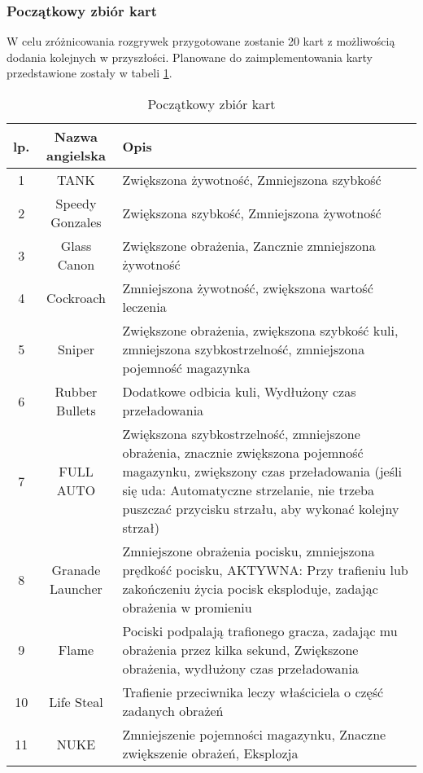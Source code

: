 \subsubsection{Początkowy zbiór kart}
W celu zróżnicowania rozgrywek przygotowane zostanie 20 kart z możliwością dodania kolejnych w przyszłości. Planowane do zaimplementowania karty przedstawione zostały w tabeli \ref{tab:cards}.

\begin{table}
    \small
    \centering
    \caption{Początkowy zbiór kart}
    \label{tab:cards}
    \begin{tabularx}{\linewidth}{|c|c|X|}
        \hline
        lp. & Nazwa angielska & Opis\\
        \hline \hline
        1   & TANK & Zwiększona żywotność, Zmniejszona szybkość \\
        \hline 
        2   & Speedy Gonzales & Zwiększona szybkość, Zmniejszona żywotność \\
        \hline 
        3   & Glass Canon & Zwiększone obrażenia, Zancznie zmniejszona żywotność \\
        \hline 
        4   & Cockroach & Zmniejszona żywotność, zwiększona wartość leczenia \\
        \hline 
        5   & Sniper & Zwiększone obrażenia, zwiększona szybkość kuli, zmniejszona szybkostrzelność, zmniejszona pojemność magazynka \\
        \hline 
        6   & Rubber Bullets & Dodatkowe odbicia kuli, Wydłużony czas przeładowania\\
        \hline 
        7   & FULL AUTO & Zwiększona szybkostrzelność, zmniejszone obrażenia, znacznie zwiększona pojemność magazynku, zwiększony czas przeładowania (jeśli się uda: Automatyczne strzelanie, nie trzeba puszczać przycisku strzału, aby wykonać kolejny strzał) \\
        \hline 
        8   & Granade Launcher & Zmniejszone obrażenia pocisku, zmniejszona prędkość pocisku, AKTYWNA: Przy trafieniu lub zakończeniu życia pocisk eksploduje, zadając obrażenia w promieniu \\
        \hline 
        9   & Flame & Pociski podpalają trafionego gracza, zadając mu obrażenia przez kilka sekund, Zwiększone obrażenia, wydłużony czas przeładowania \\
        \hline 
        10  & Life Steal & Trafienie przeciwnika leczy właściciela o część zadanych obrażeń  \\
        \hline 
        11  & NUKE & Zmniejszenie pojemności magazynku, Znaczne zwiększenie obrażeń, Eksplozja\\

\end{tabularx}
\end{table}
